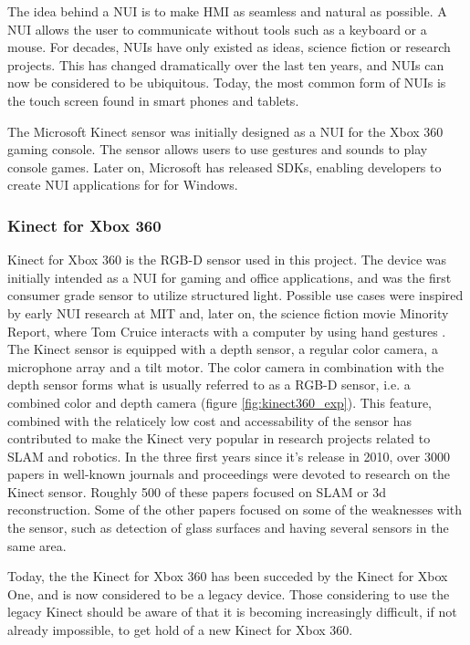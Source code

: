The idea behind a \ac{NUI} is to make \ac{HMI} as seamless and natural as possible. A \ac{NUI} allows the user to communicate without tools such as a keyboard or a mouse. For decades, \ac{NUI}s have only existed as ideas, science fiction or research projects. This has changed dramatically over the last ten years, and \ac{NUI}s can now be considered to be ubiquitous. Today, the most common form of \ac{NUI}s is the touch screen found in smart phones and tablets. 

The Microsoft Kinect sensor was initially designed as a \ac{NUI} for the Xbox 360 gaming console. The sensor allows users to use gestures and sounds to play console games. Later on, Microsoft has released SDKs, enabling developers to create \ac{NUI} applications for for Windows. 

\subsubsection{Kinect for Xbox 360}

Kinect for Xbox 360 is the RGB-D sensor used in this project. The device  was initially intended as a \ac{NUI} for gaming and office applications, and was the first consumer grade sensor to utilize structured light. Possible use cases were inspired by early \ac{NUI} research at \ac{MIT} and, later on, the science fiction movie Minority Report, where Tom Cruice interacts with a computer by using hand gestures \cite{kinect_book}. The Kinect sensor is equipped with a depth sensor, a regular color camera, a microphone array and a tilt motor. The color camera in combination with the depth sensor forms what is usually referred to as a RGB-D sensor, i.e. a combined color and depth camera (figure \ref{fig:kinect360_exp}). This feature, combined with the relaticely low cost and accessability of the sensor has contributed to make the Kinect very popular in research projects related to \ac{SLAM} and robotics. In the three first years since it's release in 2010, over 3000 papers in well-known journals and proceedings were devoted to research on the Kinect sensor. Roughly 500 of these papers focused on \ac{SLAM} or 3d reconstruction\cite{Berger2013}. Some of the other papers focused on some of the weaknesses with the sensor, such as detection of glass surfaces and having several sensors in the same area. 


Today, the the Kinect for Xbox 360 has been succeded by the Kinect for Xbox One, and is now considered to be a legacy device. Those considering to use the legacy Kinect should be aware of that it is becoming increasingly difficult, if not already impossible, to get hold of a new Kinect for Xbox 360. 


